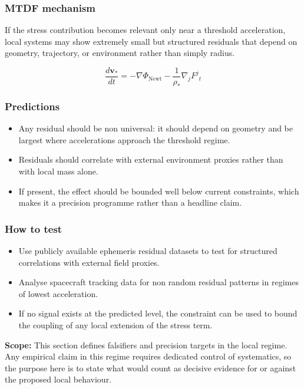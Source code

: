 \documentclass[11pt,a4paper]{article}
\begin{document}
\subsubsection{MTDF mechanism}
If the stress contribution becomes relevant only near a threshold acceleration, local systems may show extremely small but structured residuals that depend on geometry, trajectory, or environment rather than simply radius.

$$
\frac{d\mathbf{v}_*}{dt} = -\nabla \Phi_{\mathrm{Newt}} - \frac{1}{\rho_*}\nabla_j F^{j}{}_{t}
$$

\subsubsection{Predictions}
\begin{itemize}
  \item Any residual should be non universal: it should depend on geometry and be largest where accelerations approach the threshold regime.
  \item Residuals should correlate with external environment proxies rather than with local mass alone.
  \item If present, the effect should be bounded well below current constraints, which makes it a precision programme rather than a headline claim.
\end{itemize}

\subsubsection{How to test}
\begin{itemize}
  \item Use publicly available ephemeris residual datasets to test for structured correlations with external field proxies.
  \item Analyse spacecraft tracking data for non random residual patterns in regimes of lowest acceleration.
  \item If no signal exists at the predicted level, the constraint can be used to bound the coupling of any local extension of the stress term.
\end{itemize}

\begin{mdframed}[linecolor=accent,linewidth=0.5pt,backgroundcolor=callout-bg,leftline=true,rightline=true,topline=true,bottomline=true,innerleftmargin=8pt,innerrightmargin=8pt,innertopmargin=6pt,innerbottommargin=6pt]
\textbf{Scope:} This section defines falsifiers and precision targets in the local regime. Any empirical claim in this regime requires dedicated control of systematics, so the purpose here is to state what would count as decisive evidence for or against the proposed local behaviour.
\end{mdframed}
\end{document}
